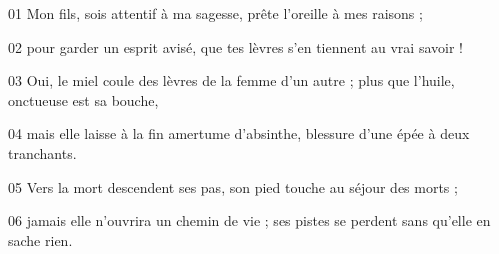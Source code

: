 01 Mon fils, sois attentif à ma sagesse, prête l’oreille à mes raisons ;

02 pour garder un esprit avisé, que tes lèvres s’en tiennent au vrai savoir !

03 Oui, le miel coule des lèvres de la femme d’un autre ; plus que l’huile, onctueuse est sa bouche,

04 mais elle laisse à la fin amertume d’absinthe, blessure d’une épée à deux tranchants.

05 Vers la mort descendent ses pas, son pied touche au séjour des morts ;

06 jamais elle n’ouvrira un chemin de vie ; ses pistes se perdent sans qu’elle en sache rien.
